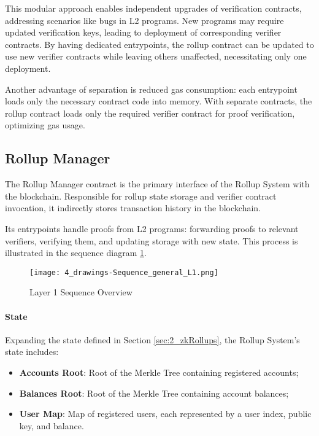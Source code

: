 This modular approach enables independent upgrades of verification contracts, addressing scenarios like bugs in L2 programs. New programs may require updated verification keys, leading to deployment of corresponding verifier contracts. By having dedicated entrypoints, the rollup contract can be updated to use new verifier contracts while leaving others unaffected, necessitating only one deployment.

Another advantage of separation is reduced gas consumption: each entrypoint loads only the necessary contract code into memory. With separate contracts, the rollup contract loads only the required verifier contract for proof verification, optimizing gas usage.

\subsection{Rollup Manager\label{sec:designrollupcontract}}
The Rollup Manager contract is the primary interface of the Rollup System with the blockchain. Responsible for rollup state storage and verifier contract invocation, it indirectly stores transaction history in the blockchain.

Its entrypoints handle proofs from L2 programs: forwarding proofs to relevant verifiers, verifying them, and updating storage with new state. This process is illustrated in the sequence diagram \ref{fig:Layer1sequencediagram}.

\begin{figure}[ht]
  \centering
  \texttt{[image: 4\_drawings-Sequence\_general\_L1.png]}
  \caption{Layer 1 Sequence Overview}
  \label{fig:Layer1sequencediagram}
\end{figure}

\paragraph{State}
Expanding the state defined in Section \ref{sec:2_zkRollups}, the Rollup System's state includes:
\begin{itemize}
  \item \textbf{Accounts Root}: Root of the Merkle Tree containing registered accounts;
  \item \textbf{Balances Root}: Root of the Merkle Tree containing account balances;
  \item \textbf{User Map}: Map of registered users, each represented by a user index, public key, and balance.
\end{itemize}

